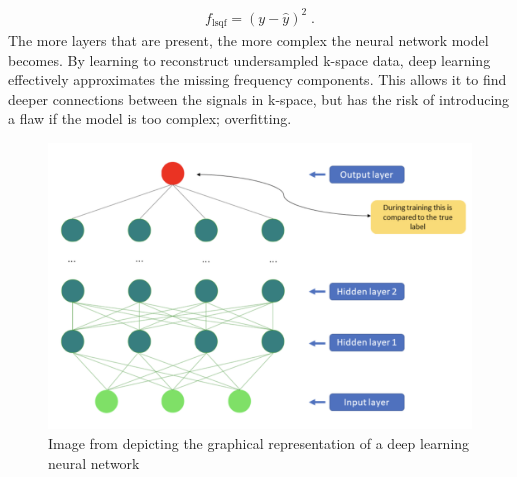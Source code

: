\documentclass[14pt]{extreport}
\begin{document}
        \begin{align}
            f_{\text{lsqf}} = \left(y - \hat{y} \right)^2\;.
        \end{align}
        The more layers that are present, the more complex the neural network model becomes. By learning to reconstruct undersampled k-space data, deep learning effectively approximates the missing frequency components. This allows it to find deeper connections between the signals in k-space, but has the risk of introducing a flaw if the model is too complex; overfitting. 

        \begin{figure}[h]
            \begin{center}
                \includegraphics[width = 0.6\linewidth]{Neural Network.png}
                \caption{Image from \cite{Lundervold_Lundervold_2019} depicting the graphical representation of a deep learning neural network}
            \end{center}
        \end{figure}
\end{document}
